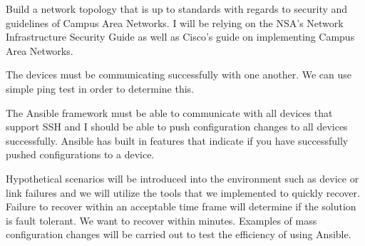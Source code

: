 \documentclass[12pt, letterpaper]{article}
\begin{document}
\medskip

Build a network topology that is up to standards with regards to security and guidelines of Campus Area Networks. I will be relying on the NSA’s Network Infrastructure Security Guide as well as Cisco’s guide on implementing Campus Area Networks. 

\medskip

The devices must be communicating successfully with one another. We can use simple ping test in order to determine this. 

\medskip

The Ansible framework must be able to communicate with all devices that support SSH and I should be able to push configuration changes to all devices successfully. Ansible has built in features that indicate if you have successfully pushed configurations to a device. 

\medskip

Hypothetical scenarios will be introduced into the environment such as device or link failures and we will utilize the tools that we implemented to quickly recover. Failure to recover within an acceptable time frame will determine if the solution is fault tolerant. We want to recover within minutes. Examples of mass configuration changes will be carried out to test the efficiency of using Ansible. 
\end{document}
